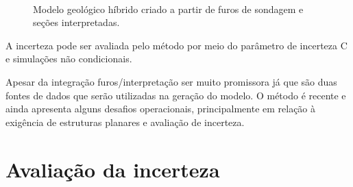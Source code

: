 \begin{figure}[t]
\caption{Modelo geológico híbrido criado a partir de furos de sondagem e seções interpretadas.}\label{mls_model}
\begin{center}
\\
\end{center}
\begin{center}
\end{center}
\end{figure}

A incerteza pode ser avaliada pelo método por meio do parâmetro de incerteza C e simulações não condicionais. 

Apesar da integração furos/interpretação ser muito promissora já que são duas fontes de dados que serão utilizadas na geração do modelo. O método é recente e ainda apresenta alguns desafios operacionais, principalmente em relação à exigência de estruturas planares e avaliação de incerteza.

\section{Avaliação da incerteza}

